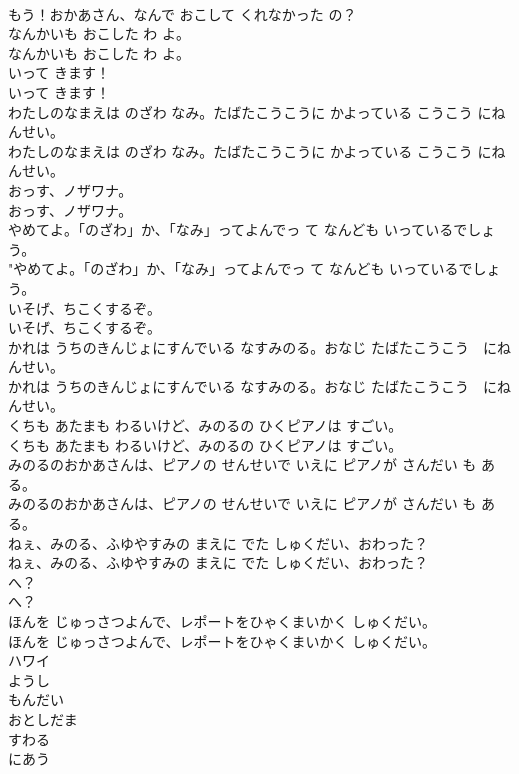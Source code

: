 \documentclass[8pt]{extreport}
\begin{document}
\begin{CJK}{UTF8}{min}
\\	もう！おかあさん、なんで おこして くれなかった の？ 
\\	なんかいも おこした わ よ。	
\\	なんかいも おこした わ よ。 
\\	いって きます！	
\\	いって きます！ 
\\	わたしのなまえは のざわ なみ。たばたこうこうに かよっている こうこう にねんせい。	
\\	わたしのなまえは のざわ なみ。たばたこうこうに かよっている こうこう にねんせい。 
\\	おっす、ノザワナ。	
\\	おっす、ノザワナ。 
\\	やめてよ。「のざわ」か、「なみ」ってよんでっ て なんども いっているでしょう。	
\\	"やめてよ。「のざわ」か、「なみ」ってよんでっ て なんども いっているでしょう。 
\\	いそげ、ちこくするぞ。	
\\	いそげ、ちこくするぞ。 
\\	かれは うちのきんじょにすんでいる なすみのる。おなじ たばたこうこう　にねんせい。	
\\	かれは うちのきんじょにすんでいる なすみのる。おなじ たばたこうこう　にねんせい。 
\\	くちも あたまも わるいけど、みのるの ひくピアノは すごい。	
\\	くちも あたまも わるいけど、みのるの ひくピアノは すごい。 
\\	みのるのおかあさんは、ピアノの せんせいで いえに ピアノが さんだい も ある。	
\\	みのるのおかあさんは、ピアノの せんせいで いえに ピアノが さんだい も ある。 
\\	ねぇ、みのる、ふゆやすみの まえに でた しゅくだい、おわった？	
\\	ねぇ、みのる、ふゆやすみの まえに でた しゅくだい、おわった？ 
\\	へ？	
\\	へ？ 
\\	ほんを じゅっさつよんで、レポートをひゃくまいかく しゅくだい。	
\\	ほんを じゅっさつよんで、レポートをひゃくまいかく しゅくだい。 
\\	ハワイ
\\	ようし
\\	もんだい
\\	おとしだま
\\	すわる
\\	にあう

\end{CJK}
\end{document}
